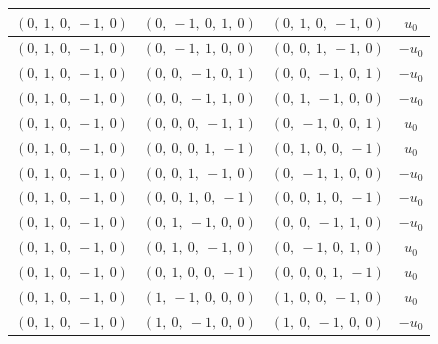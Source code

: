 \documentclass[11pt]{article}
\theoremstyle{definition}
\begin{document}
\begin{longtable}{|l|l|l|c|}
    \hline
    $\left( 0, \  1, \  0, \  -1, \  0\right)$ & $\left( 0, \  -1, \  0, \  1, \  0\right)$ & $\left( 0, \  1, \  0, \  -1, \  0\right)$ & $u_{0}$ \\
    \hline
    $\left( 0, \  1, \  0, \  -1, \  0\right)$ & $\left( 0, \  -1, \  1, \  0, \  0\right)$ & $\left( 0, \  0, \  1, \  -1, \  0\right)$ & $- u_{0}$ \\
    \hline
    $\left( 0, \  1, \  0, \  -1, \  0\right)$ & $\left( 0, \  0, \  -1, \  0, \  1\right)$ & $\left( 0, \  0, \  -1, \  0, \  1\right)$ & $- u_{0}$ \\
    \hline
    $\left( 0, \  1, \  0, \  -1, \  0\right)$ & $\left( 0, \  0, \  -1, \  1, \  0\right)$ & $\left( 0, \  1, \  -1, \  0, \  0\right)$ & $- u_{0}$ \\
    \hline
    $\left( 0, \  1, \  0, \  -1, \  0\right)$ & $\left( 0, \  0, \  0, \  -1, \  1\right)$ & $\left( 0, \  -1, \  0, \  0, \  1\right)$ & $u_{0}$ \\
    \hline
    $\left( 0, \  1, \  0, \  -1, \  0\right)$ & $\left( 0, \  0, \  0, \  1, \  -1\right)$ & $\left( 0, \  1, \  0, \  0, \  -1\right)$ & $u_{0}$ \\
    \hline
    $\left( 0, \  1, \  0, \  -1, \  0\right)$ & $\left( 0, \  0, \  1, \  -1, \  0\right)$ & $\left( 0, \  -1, \  1, \  0, \  0\right)$ & $- u_{0}$ \\
    \hline
    $\left( 0, \  1, \  0, \  -1, \  0\right)$ & $\left( 0, \  0, \  1, \  0, \  -1\right)$ & $\left( 0, \  0, \  1, \  0, \  -1\right)$ & $- u_{0}$ \\
    \hline
    $\left( 0, \  1, \  0, \  -1, \  0\right)$ & $\left( 0, \  1, \  -1, \  0, \  0\right)$ & $\left( 0, \  0, \  -1, \  1, \  0\right)$ & $- u_{0}$ \\
    \hline
    $\left( 0, \  1, \  0, \  -1, \  0\right)$ & $\left( 0, \  1, \  0, \  -1, \  0\right)$ & $\left( 0, \  -1, \  0, \  1, \  0\right)$ & $u_{0}$ \\
    \hline
    $\left( 0, \  1, \  0, \  -1, \  0\right)$ & $\left( 0, \  1, \  0, \  0, \  -1\right)$ & $\left( 0, \  0, \  0, \  1, \  -1\right)$ & $u_{0}$ \\
    \hline
    $\left( 0, \  1, \  0, \  -1, \  0\right)$ & $\left( 1, \  -1, \  0, \  0, \  0\right)$ & $\left( 1, \  0, \  0, \  -1, \  0\right)$ & $u_{0}$ \\
    \hline
    $\left( 0, \  1, \  0, \  -1, \  0\right)$ & $\left( 1, \  0, \  -1, \  0, \  0\right)$ & $\left( 1, \  0, \  -1, \  0, \  0\right)$ & $- u_{0}$ \\

\end{longtable}
\end{document}
